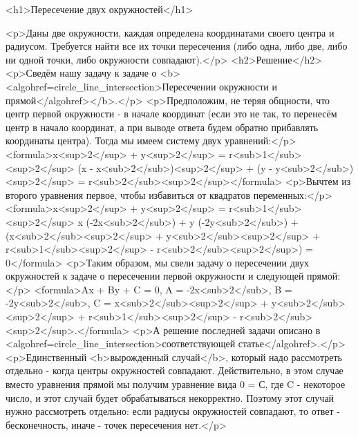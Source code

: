 <h1>Пересечение двух окружностей</h1>

<p>Даны две окружности, каждая определена координатами своего центра и радиусом. Требуется найти все их точки пересечения (либо одна, либо две, либо ни одной точки, либо окружности совпадают).</p>
<h2>Решение</h2>
<p>Сведём нашу задачу к задаче о <b><algohref=circle_line_intersection>Пересечении окружности и прямой</algohref></b>.</p>
<p>Предположим, не теряя общности, что центр первой окружности - в начале координат (если это не так, то перенесём центр в начало координат, а при выводе ответа будем обратно прибавлять координаты центра). Тогда мы имеем систему двух уравнений:</p>
<formula>x<sup>2</sup> + y<sup>2</sup> = r<sub>1</sub><sup>2</sup>
(x - x<sub>2</sub>)<sup>2</sup> + (y - y<sub>2</sub>)<sup>2</sup> = r<sub>2</sub><sup>2</sup></formula>
<p>Вычтем из второго уравнения первое, чтобы избавиться от квадратов переменных:</p>
<formula>x<sup>2</sup> + y<sup>2</sup> = r<sub>1</sub><sup>2</sup>
x (-2x<sub>2</sub>) + y (-2y<sub>2</sub>) + (x<sub>2</sub><sup>2</sup> + y<sub>2</sub><sup>2</sup> + r<sub>1</sub><sup>2</sup> - r<sub>2</sub><sup>2</sup>) = 0</formula>
<p>Таким образом, мы свели задачу о пересечении двух окружностей к задаче о пересечении первой окружности и следующей прямой:</p>
<formula>Ax + By + C = 0,
A = -2x<sub>2</sub>,
B = -2y<sub>2</sub>,
C = x<sub>2</sub><sup>2</sup> + y<sub>2</sub><sup>2</sup> + r<sub>1</sub><sup>2</sup> - r<sub>2</sub><sup>2</sup>.</formula>
<p>А решение последней задачи описано в <algohref=circle_line_intersection>соответствующей статье</algohref>.</p>
<p>Единственный <b>вырожденный случай</b>, который надо рассмотреть отдельно - когда центры окружностей совпадают. Действительно, в этом случае вместо уравнения прямой мы получим уравнение вида 0 = С, где C - некоторое число, и этот случай будет обрабатываться некорректно. Поэтому этот случай нужно рассмотреть отдельно: если радиусы окружностей совпадают, то ответ - бесконечность, иначе - точек пересечения нет.</p>